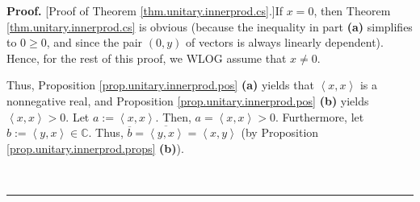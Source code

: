 \documentclass[numbers=enddot,12pt,final,onecolumn,notitlepage]{scrartcl}%
\numberwithin{exer}{subsection}
\theoremstyle{definition}
\newenvironment{proof}[1][Proof]{\noindent\textbf{#1.} }{\ \rule{0.5em}{0.5em}}
\begin{document}
\begin{proof}
[Proof of Theorem \ref{thm.unitary.innerprod.cs}.]If $x=0$, then Theorem
\ref{thm.unitary.innerprod.cs} is obvious (because the inequality in part
\textbf{(a)} simplifies to $0\geq0$, and since the pair $\left(  0,y\right)  $
of vectors is always linearly dependent). Hence, for the rest of this proof,
we WLOG assume that $x\neq0$.

Thus, Proposition \ref{prop.unitary.innerprod.pos} \textbf{(a)} yields that
$\left\langle x,x\right\rangle $ is a nonnegative real, and Proposition
\ref{prop.unitary.innerprod.pos} \textbf{(b)} yields $\left\langle
x,x\right\rangle >0$. Let $a:=\left\langle x,x\right\rangle $. Then,
$a=\left\langle x,x\right\rangle >0$. Furthermore, let $b:=\left\langle
y,x\right\rangle \in\mathbb{C}$. Thus, $\overline{b}=\overline{\left\langle
y,x\right\rangle }=\left\langle x,y\right\rangle $ (by Proposition
\ref{prop.unitary.innerprod.props} \textbf{(b)}).


\end{proof}
\end{document}
